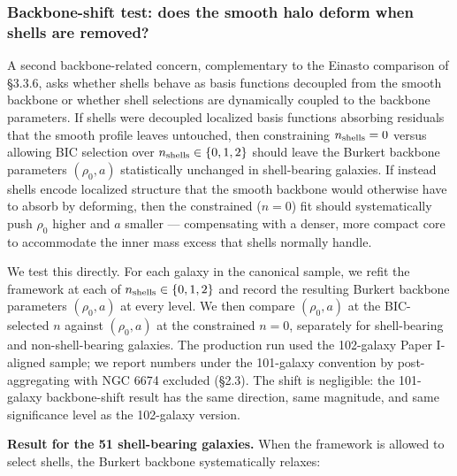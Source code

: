 \documentclass[linenumbers,trackchanges]{aastex701}
\begin{document}
\subsubsection{Backbone-shift test: does the smooth halo deform when shells are removed?}

A second backbone-related concern, complementary to the Einasto comparison of \S3.3.6, asks whether shells behave as basis functions decoupled from the smooth backbone or whether shell selections are dynamically coupled to the backbone parameters. If shells were decoupled localized basis functions absorbing residuals that the smooth profile leaves untouched, then constraining $n_{\rm shells} = 0$ versus allowing BIC selection over $n_{\rm shells} \in \{0, 1, 2\}$ should leave the Burkert backbone parameters $(\rho_0, a)$ statistically unchanged in shell-bearing galaxies. If instead shells encode localized structure that the smooth backbone would otherwise have to absorb by deforming, then the constrained ($n = 0$) fit should systematically push $\rho_0$ higher and $a$ smaller --- compensating with a denser, more compact core to accommodate the inner mass excess that shells normally handle.

We test this directly. For each galaxy in the canonical sample, we refit the framework at each of $n_{\rm shells} \in \{0, 1, 2\}$ and record the resulting Burkert backbone parameters $(\rho_0, a)$ at every level. We then compare $(\rho_0, a)$ at the BIC-selected $n$ against $(\rho_0, a)$ at the constrained $n = 0$, separately for shell-bearing and non-shell-bearing galaxies. The production run used the 102-galaxy Paper I-aligned sample; we report numbers under the 101-galaxy convention by post-aggregating with NGC 6674 excluded (\S2.3). The shift is negligible: the 101-galaxy backbone-shift result has the same direction, same magnitude, and same significance level as the 102-galaxy version.

\textbf{Result for the 51 shell-bearing galaxies.} When the framework is allowed to select shells, the Burkert backbone systematically relaxes:
\end{document}
